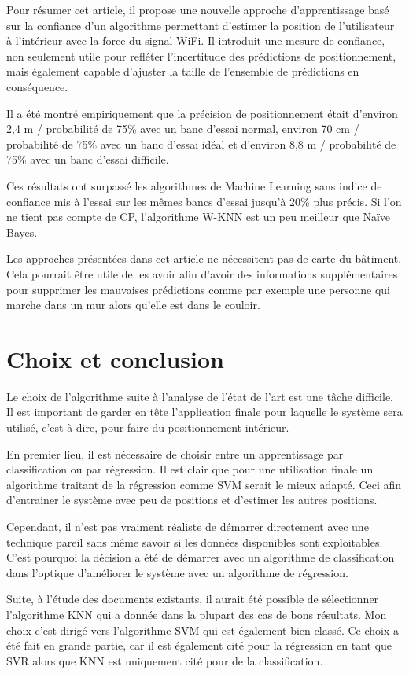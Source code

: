 Pour résumer cet article, il propose une nouvelle approche d'apprentissage basé sur la confiance d'un algorithme permettant d'estimer la position de l'utilisateur à l'intérieur avec la force du signal WiFi. Il introduit une mesure de confiance, non seulement utile pour refléter l'incertitude des prédictions de positionnement, mais également capable d'ajuster la taille de l'ensemble de prédictions en conséquence. 

Il a été montré empiriquement que la précision de positionnement était d’environ 2,4 m / probabilité de 75\% avec un banc d’essai normal, environ 70 cm / probabilité de 75\% avec un banc d’essai idéal et d’environ 8,8 m / probabilité de 75\% avec un banc d’essai difficile. 

Ces résultats ont surpassé les algorithmes de Machine Learning sans indice de confiance mis à l'essai sur les mêmes bancs d'essai jusqu'à 20\% plus précis. Si l'on ne tient pas compte de CP, l'algorithme W-KNN est un peu meilleur que Naïve Bayes. 

Les approches présentées dans cet article ne nécessitent pas de carte du bâtiment. Cela pourrait être utile de les avoir afin d'avoir des informations supplémentaires pour supprimer les mauvaises prédictions comme par exemple une personne qui marche dans un mur alors qu'elle est dans le couloir.

\section{Choix et conclusion}
Le choix de l'algorithme suite à l'analyse de l'état de l'art est une tâche difficile. Il est important de garder en tête l'application finale pour laquelle le système sera utilisé, c'est-à-dire, pour faire du positionnement intérieur.

En premier lieu, il est nécessaire de choisir entre un apprentissage par classification ou par régression. Il est clair que pour une utilisation finale un algorithme traitant de la régression comme SVM serait le mieux adapté. Ceci afin d'entrainer le système avec peu de positions et d'estimer les autres positions.

Cependant, il n'est pas vraiment réaliste de démarrer directement avec une technique pareil sans même savoir si les données disponibles sont exploitables. C'est pourquoi la décision a été de démarrer avec un algorithme de classification dans l'optique d'améliorer le système avec un algorithme de régression.

Suite, à l'étude des documents existants, il aurait été possible de sélectionner l'algorithme KNN qui a donnée dans la plupart des cas de bons résultats. Mon choix c'est dirigé vers l'algorithme SVM qui est également bien classé. Ce choix a été fait en grande partie, car il est également cité pour la régression en tant que SVR alors que KNN est uniquement cité pour de la classification. 

